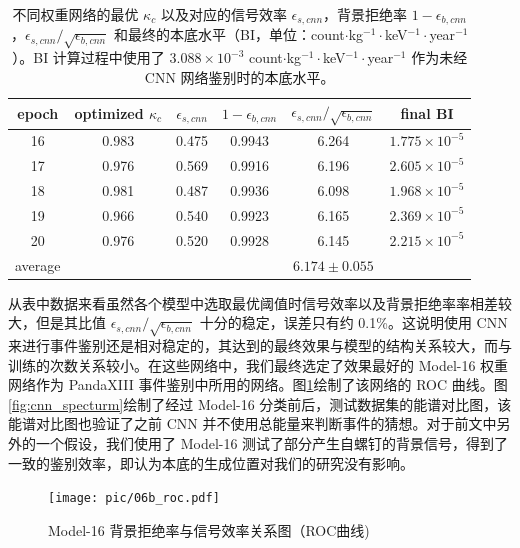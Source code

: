 \begin{table}
    \centering
    \begin{tabular}{cccccc}
      \\\hline
      epoch & optimized $\kappa_c$ & $\epsilon_{s,cnn}$ & $ 1-\epsilon_{b,cnn}$ &$\epsilon_{s,cnn}/\sqrt{\epsilon_{b,cnn}}$ & final BI\\\hline
      16 & 0.983 & 0.475 & 0.9943 & 6.264 & $1.775\times10^{-5}$ \\
      17 & 0.976 & 0.569 & 0.9916 & 6.196 & $2.605\times10^{-5}$ \\
      18 & 0.981 & 0.487 & 0.9936 & 6.098 & $1.968\times10^{-5}$ \\
      19 & 0.966 & 0.540 & 0.9923 & 6.165 & $2.369\times10^{-5}$ \\
      20 & 0.976 & 0.520 & 0.9928 & 6.145 & $2.215\times10^{-5}$ \\\hline
      average &  &  &  & $6.174\pm0.055$ \\\hline
    \end{tabular}
    \caption{不同权重网络的最优 $\kappa_c$ 以及对应的信号效率 $\epsilon_{s,cnn}$，背景拒绝率 $1-\epsilon_{b,cnn}$，$\epsilon_{s,cnn}/\sqrt{\epsilon_{b,cnn}}$ 和最终的本底水平（BI，单位：count$\cdot$kg$^{-1}\cdot$keV$^{-1}\cdot$year$^{-1}$）。BI 计算过程中使用了 $3.088\times10^{-3}$ count$\cdot$kg$^{-1}\cdot$keV$^{-1}\cdot$year$^{-1}$ 作为未经 CNN 网络鉴别时的本底水平。}
    \label{tab:efficiencies}
  \end{table}
  
从表中数据来看虽然各个模型中选取最优阈值时信号效率以及背景拒绝率率相差较大，但是其比值 $\epsilon_{s,cnn}/\sqrt{\epsilon_{b,cnn}}$ 十分的稳定，误差只有约 0.1\%。这说明使用 CNN 来进行事件鉴别还是相对稳定的，其达到的最终效果与模型的结构关系较大，而与训练的次数关系较小。在这些网络中，我们最终选定了效果最好的 Model-16 权重网络作为 PandaXIII 事件鉴别中所用的网络。图\ref{fig:cnn_roc}绘制了该网络的 ROC 曲线。图\ref{fig:cnn_specturm}绘制了经过 Model-16 分类前后，测试数据集的能谱对比图，该能谱对比图也验证了之前 CNN 并不使用总能量来判断事件的猜想。对于前文中另外的一个假设，我们使用了 Model-16 测试了部分产生自螺钉的背景信号，得到了一致的鉴别效率，即认为本底的生成位置对我们的研究没有影响。

\begin{figure}
    \centering
    \texttt{[image: pic/06b\_roc.pdf]}
    \caption{Model-16 背景拒绝率与信号效率关系图（ROC曲线)}
    \label{fig:cnn_roc}
\end{figure}

